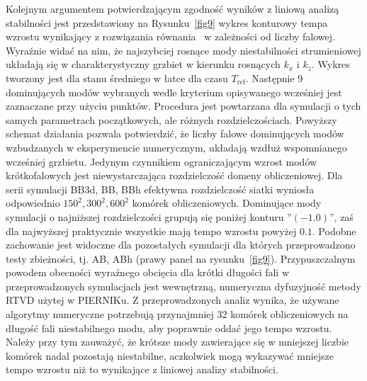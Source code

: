 \par Kolejnym argumentem potwierdzającym zgodność wyników z liniową analizą
stabilności jest przedstawiony na Rysunku~\ref{fig9} wykres konturowy tempa
wzrostu wynikający z rozwiązania równania~ w zależności od
liczby falowej. Wyraźnie widać na nim, że najszybciej rosnące mody
niestabilności strumieniowej układają się w charakterystyczny grzbiet w kierunku
rosnących $k_x$ i $k_z$.  Wykres tworzony jest dla stanu średniego w łatce dla
czasu $T_{\textrm{ref}}$.  Następnie 9 dominujących modów wybranych wedle
kryterium opisywanego wcześniej jest zaznaczane przy użyciu punktów. Procedura
jest powtarzana dla symulacji o tych samych parametrach początkowych, ale
różnych rozdzielczościach.  Powyższy schemat działania pozwala potwierdzić, że
liczby falowe dominujących modów wzbudzanych w eksperymencie numerycznym,
układają wzdłuż wspomnianego wcześniej grzbietu. Jedynym czynnikiem
ograniczającym wzrost modów krótkofalowych jest niewystarczająca rozdzielczość
domeny obliczeniowej. Dla serii symulacji BB3d, BB, BBh efektywna rozdzielczość
siatki wyniosła odpowiednio $150^2, 300^2, 600^2$ komórek obliczeniowych.
Dominujące mody symulacji o najniższej rozdzielczości grupują się poniżej
konturu ''$(-1.0)$'', zaś dla najwyższej praktycznie wszystkie mają tempo
wzrostu powyżej $0.1$. Podobne zachowanie jest widoczne dla pozostałych
symulacji dla których przeprowadzono testy zbieżności, tj. AB, ABh (prawy panel
na rysunku~\ref{fig9}). Przypuszczalnym powodem obecności wyraźnego obcięcia dla
krótki długości fali w przeprowadzonych symulacjach jest wewnętrzną, numeryczna
dyfuzyjność metody RTVD użytej w PIERNIKu. Z przeprowadzonych analiz wynika, że
używane algorytmy numeryczne potrzebują przynajmniej 32 komórek obliczeniowych
na długość fali niestabilnego modu, aby poprawnie oddać jego tempo wzrostu.
Należy przy tym zauważyć, że krótsze mody zawierające się w mniejszej liczbie
komórek nadal pozostają niestabilne, aczkolwiek mogą wykazywać mniejsze tempo
wzrostu niż to wynikające z liniowej analizy stabilności.

